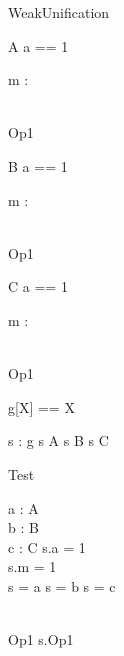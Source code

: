 \begin{zsection}
 \SECTION WeakUnification
\end{zsection}

\begin{class}{A}
  a == 1
  \begin{state}
    m : \nat
  \end{state}\\
  Op1 \sdef [x? : \nat]
\end{class}

\begin{class}{B}
  a == 1\\
  \begin{state}
    m : \nat
  \end{state}\\
  Op1 \sdef [x? : \nat]\\
\end{class}

\begin{class}{C}
  a == 1\\
  \begin{state}
    m : \nat
  \end{state}\\
  Op1 \sdef [x? : \nat]\\
\end{class}

\begin{zed}
  g[X] == X
\end{zed}

\begin{axdef}
  s : g
\where
  s \in A\lor
  s \in B\lor
  s \in C
\end{axdef}

\begin{class}{Test}
 \begin{state}
   a : A\\
   b : B\\
   c : C
 \where
   s.a = 1\\
   s.m = 1\\
   s = a\lor
   s = b\lor
   s = c
 \end{state}\\
 Op1 \sdef s.Op1\\
\end{class}
